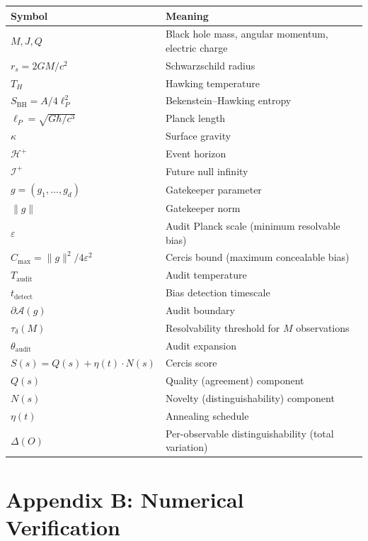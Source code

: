\documentclass[12pt,a4paper]{article}
\theoremstyle{remark}
\begin{document}
\begin{table}[H]
\centering
\begin{tabular}{@{}ll@{}}
\toprule
\textbf{Symbol} & \textbf{Meaning} \\
\midrule
$M, J, Q$ & Black hole mass, angular momentum, electric charge \\
$r_s = 2GM/c^2$ & Schwarzschild radius \\
$T_H$ & Hawking temperature \\
$S_{\text{BH}} = A/4\ell_P^2$ & Bekenstein--Hawking entropy \\
$\ell_P = \sqrt{G\hbar/c^3}$ & Planck length \\
$\kappa$ & Surface gravity \\
$\mathcal{H}^+$ & Event horizon \\
$\mathcal{I}^+$ & Future null infinity \\
\midrule
$g = (g_1, \ldots, g_d)$ & Gatekeeper parameter \\
$\|g\|$ & Gatekeeper norm \\
$\varepsilon$ & Audit Planck scale (minimum resolvable bias) \\
$C_{\max} = \|g\|^2/4\varepsilon^2$ & Cercis bound (maximum concealable bias) \\
$T_{\text{audit}}$ & Audit temperature \\
$t_{\text{detect}}$ & Bias detection timescale \\
$\partial\mathcal{A}(g)$ & Audit boundary \\
$\tau_{\delta}(M)$ & Resolvability threshold for $M$ observations \\
$\theta_{\text{audit}}$ & Audit expansion \\
\midrule
$S(s) = Q(s) + \eta(t) \cdot N(s)$ & Cercis score \\
$Q(s)$ & Quality (agreement) component \\
$N(s)$ & Novelty (distinguishability) component \\
$\eta(t)$ & Annealing schedule \\
$\Delta(O)$ & Per-observable distinguishability (total variation) \\
\bottomrule
\end{tabular}
\end{table}

\section*{Appendix B: Numerical Verification}
\label{app:numerical}
\end{document}
